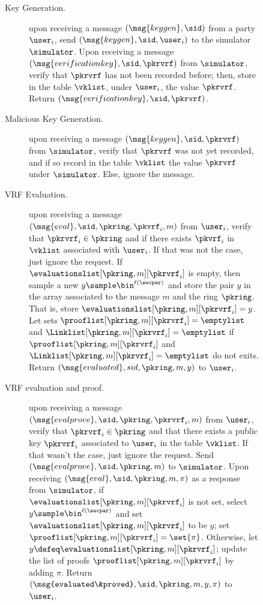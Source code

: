 \begin{figure}
	\scriptsize
	\begin{tcolorbox}
		{  \begin{description}
				\item[Key Generation.] upon receiving a message $(\msg{keygen}, \sid)$ from a party $\user_i$, send $(\msg{keygen}, \sid, \user_i)$ to the simulator $\simulator$.
				Upon receiving a message $(\msg{verificationkey}, \sid, \pkrvrf)$ from $\simulator$, verify that $\pkrvrf$ has not been recorded before; then, store in the table $\vklist$, under $\user_i$, the value $\pkrvrf$.
				Return $(\msg{verificationkey}, \sid, \pkrvrf)$.
				
				\item[Malicious Key Generation.] upon receiving a message $(\msg{keygen}, \sid, \pkrvrf)$ from $\simulator$, verify that $\pkrvrf$ was not yet recorded, and if so record in the table $\vklist$ the value $\pkrvrf$ under $\simulator$. Else, ignore the message.
				
				\item[VRF Evaluation.] upon receiving a message $(\msg{eval}, \sid, \pkring, \pkvrf_i, m)$ from $\user_i$, verify that $\pkrvrf_i \in \pkring$ and if there exists $ \pkvrf_i $ in $\vklist $ associated with $ \user_i $. If that was not the case, just ignore the request.
				If $\evaluationslist[\pkring, m][\pkrvrf_i]$ is empty, then sample a new $y \sample \bin^{\ell(\secpar)}$ and store the pair $y$ in the array associated to the message $m$ and the ring $\pkring$. That is, store $\evaluationslist[\pkring, m][\pkrvrf_i] = y$.
				Let sets $\prooflist[\pkring, m][\pkrvrf_i] = \emptylist$ and $\Linklist[\pkring, m][\pkrvrf_i] = \emptylist$ if $ \prooflist[\pkring, m][\pkrvrf_i] $ and $\Linklist[\pkring, m][\pkrvrf_i] = \emptylist$ do not exits. Return $(\msg{evaluated}, sid, \pkring, m, y)$ to $ \user_i $.
				
				
				\item[VRF evaluation and proof.] upon receiving a message $(\msg{evalprove}, \sid, \pkring, \pkrvrf_i, m)$ from $\user_i$, verify that $\pkrvrf_i \in \pkring$ and that there exists a public key $\pkrvrf_i$ associated to $\user_i$ in the table $ \vklist $. If that wasn't the case, just ignore the request.
				Send $(\msg{evalprove}, \sid, \pkring, m)$ to $\simulator$. Upon receiving $(\msg{eval}, \sid, \pkring, m, \pi)$ as a response from $\simulator$, if $\evaluationslist[\pkring, m][\pkrvrf_i]$ is not set, select $y \sample \bin^{\ell(\secpar)}$ and set $\evaluationslist[\pkring, m][\pkrvrf_i]$ to be $y$; set $\prooflist[\pkring, m][\pkrvrf_i] = \set{\pi}$. Otherwise, let $y \defeq \evaluationslist[\pkring, m][\pkrvrf_i]$; update the list of proofs $\prooflist[\pkring, m][\pkrvrf_i]$ by adding $\pi$. Return $(\msg{evaluated\&proved}, \sid, \pkring,m, y, \pi)$ to $\user_i$.
				

\end{description}}
\end{tcolorbox}
\end{figure}
